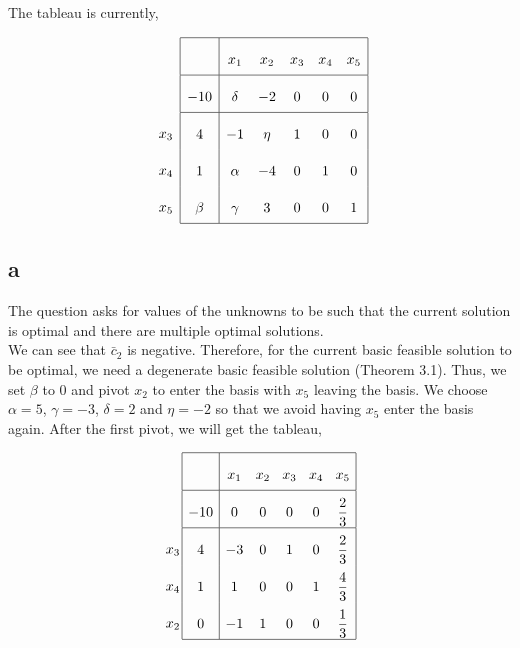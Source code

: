 The tableau is currently, 


$$
\begin{array}{c}
\\
 \\
x_3 \\
x_4 \\ 
x_5 \\
\end{array}
\begin{array}{|c|ccccc|}
    \hline
    & x_1 & x_2 & x_3 & x_4 & x_5\\ \hline
  -10 & \delta & -2 & 0 & 0 & 0\\ \hline
  4 & -1 & \eta & 1 & 0 & 0\\
  1 & \alpha & -4 & 0 & 1 & 0\\
  \beta & \gamma & 3 & 0 & 0 & 1\\\hline
\end{array}
$$

\subsection*{a}
The question asks for values of the unknowns to be such that the current solution is optimal and there are multiple optimal solutions. \\

We can see that $\bar{c}_2$ is negative. Therefore, for the current basic feasible solution to be optimal, we need a degenerate basic feasible solution (Theorem 3.1). Thus, we set $\beta$ to $0$ and pivot $x_2$ to enter the basis with $x_5$ leaving the basis. We choose $\alpha = 5$, $\gamma = -3$, $\delta = 2$ and $\eta = -2$ so that we avoid having $x_5$ enter the basis again. After the first pivot, we will get the tableau,

$$
\arraycolsep=1.4pt\def\arraystretch{2.2}
\begin{array}{c}
\\
 \\
x_3 \\
x_4 \\ 
x_2 \\
\end{array}
\arraycolsep=4.4pt\def\arraystretch{2.2}
\begin{array}{|c|ccccc|}
    \hline
    & x_1 & x_2 & x_3 & x_4 & x_5\\ \hline 
 -10 & 0 & 0 & 0 & 0 & \dfrac{2}{3}\\ \hline
  4 & -3 & 0 & 1 & 0 & \dfrac{2}{3}\\
  1 & 1 & 0 & 0 & 1 & \dfrac{4}{3}\\
  0 & -1 & 1 & 0 & 0 & \dfrac{1}{3}\\\hline
\end{array}
$$

